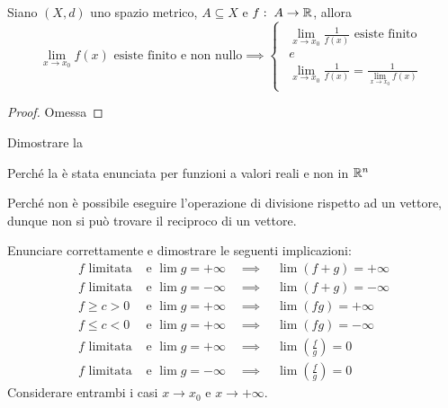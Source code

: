 \begin{proposition}
	\label{prop:lim_recipr_funz}
	Siano $(X,d)$ uno spazio metrico, $A \subseteq X$ e $f:\; A \to \mathbb{R}$, allora
	\[
		\lim\limits_{x \to x_0} f(x) \text{ esiste finito e non nullo}
		\implies
		\begin{cases}
			\begin{array}{c}
				\lim\limits_{x \to x_0} \frac{1}{f(x)} \text{ esiste finito}\\
				e\\
				\lim\limits_{x \to x_0} \frac{1}{f(x)} = \frac{1}{\lim\limits_{x \to x_0} f(x)}
			\end{array}
		\end{cases}
	\]
	\begin{proof}
		Omessa
	\end{proof}
\end{proposition}
\begin{exercise}
	Dimostrare la 
\end{exercise}
\begin{exercise}
	Perché la  è stata enunciata per funzioni a valori reali e non in $\mathbb{R}^n$
	\begin{solution}
		Perché non è possibile eseguire l'operazione di divisione rispetto ad un vettore, dunque non si può trovare il reciproco di un vettore.
	\end{solution}
\end{exercise}
\begin{exercise}
	\label{ex:dim_form_det}
	Enunciare correttamente e dimostrare le seguenti implicazioni:
	\begin{align*}
		f \text{ limitata} &\text{ e } \lim g = +\infty \quad \implies \quad \lim(f + g) = +\infty\\
		f \text{ limitata} &\text{ e } \lim g = -\infty \quad \implies \quad \lim(f + g) = -\infty\\
		f \geq c > 0 &\text{ e } \lim g = +\infty \quad \implies \quad \lim(fg) = +\infty\\
		f \leq c < 0 &\text{ e } \lim g = +\infty \quad \implies \quad \lim(fg) = -\infty\\
		f \text{ limitata} &\text{ e } \lim g = +\infty \quad \implies \quad \lim\left(\frac{f}{g}\right) = 0\\
		f \text{ limitata} &\text{ e } \lim g = -\infty \quad \implies \quad \lim\left(\frac{f}{g}\right) = 0
	\end{align*}
	Considerare entrambi i casi $x \to x_0$ e $x \to +\infty$.
\end{exercise}
